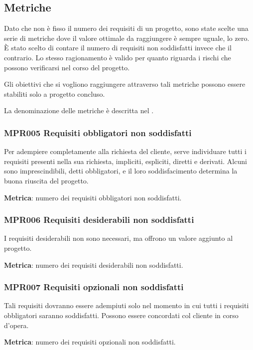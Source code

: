 	\subsection{Metriche}
	Dato che non è fisso il numero dei requisiti di un progetto, sono state scelte una serie di metriche dove il valore ottimale da raggiungere è sempre uguale,
	lo zero. È stato scelto di contare il numero di requisiti non soddisfatti invece che il contrario. Lo stesso ragionamento è valido per quanto
	riguarda i rischi che possono verificarsi nel corso del progetto.
	
	Gli obiettivi che si vogliono raggiungere attraverso tali metriche possono essere stabiliti solo a progetto concluso.
	
	La denominazione delle metriche è descritta nel \NdPd.
	
		\subsubsection{MPR005 Requisiti obbligatori non soddisfatti}
		Per adempiere completamente alla richiesta del cliente, serve individuare tutti i requisiti presenti nella sua richiesta, impliciti, espliciti, diretti e derivati. Alcuni sono imprescindibili, detti obbligatori, e il loro soddisfacimento determina la buona riuscita del progetto.
		
		\textbf{Metrica}: numero dei requisiti obbligatori non soddisfatti.
		
		\subsubsection{MPR006 Requisiti desiderabili non soddisfatti}
		I requisiti desiderabili non sono necessari, ma offrono un valore aggiunto al progetto.
		
		\textbf{Metrica}: numero dei requisiti desiderabili non soddisfatti.
		
		\subsubsection{MPR007 Requisiti opzionali non soddisfatti}
		Tali requisiti dovranno essere adempiuti solo nel momento in cui tutti i requisiti obbligatori saranno soddisfatti.
		Possono essere concordati col cliente in corso d'opera.
		
		\textbf{Metrica}: numero dei requisiti opzionali non soddisfatti.
		
	